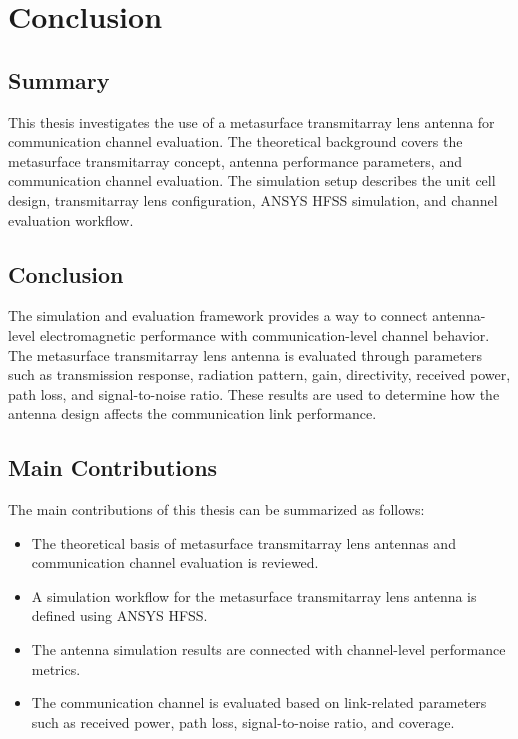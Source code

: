 \chapter{Conclusion}

\section{Summary}
This thesis investigates the use of a metasurface transmitarray lens antenna for communication channel evaluation. The theoretical background covers the metasurface transmitarray concept, antenna performance parameters, and communication channel evaluation. The simulation setup describes the unit cell design, transmitarray lens configuration, ANSYS HFSS simulation, and channel evaluation workflow.

\section{Conclusion}
The simulation and evaluation framework provides a way to connect antenna-level electromagnetic performance with communication-level channel behavior. The metasurface transmitarray lens antenna is evaluated through parameters such as transmission response, radiation pattern, gain, directivity, received power, path loss, and signal-to-noise ratio. These results are used to determine how the antenna design affects the communication link performance.

\section{Main Contributions}
The main contributions of this thesis can be summarized as follows:

\begin{itemize}
	\item The theoretical basis of metasurface transmitarray lens antennas and communication channel evaluation is reviewed.
	\item A simulation workflow for the metasurface transmitarray lens antenna is defined using ANSYS HFSS.
	\item The antenna simulation results are connected with channel-level performance metrics.
	\item The communication channel is evaluated based on link-related parameters such as received power, path loss, signal-to-noise ratio, and coverage.
\end{itemize}

